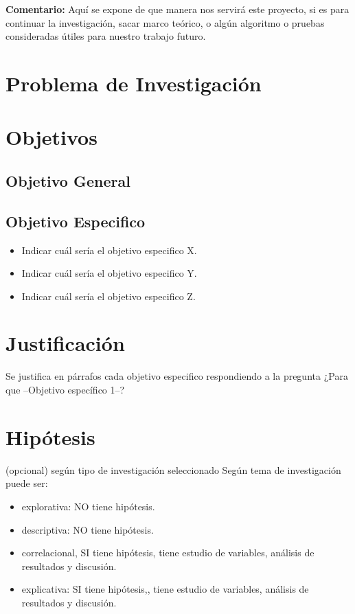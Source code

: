 \documentclass[a4paper,12pt]{report}
\begin{document}
\noindent
\textbf{Comentario:} Aquí se expone de que manera nos servirá este proyecto, si es para continuar la investigación, sacar marco teórico, o algún algoritmo o pruebas consideradas útiles para nuestro trabajo futuro.

\section{Problema de Investigación}
\section{Objetivos}
\subsection{Objetivo General}
\subsection{Objetivo Especifico}
\begin{itemize}
	\item Indicar cuál sería el objetivo especifico X.
	\item Indicar cuál sería el objetivo especifico Y.
	\item Indicar cuál sería el objetivo especifico Z.
\end{itemize}

\section{Justificación}
Se justifica en párrafos cada objetivo especifico respondiendo a la pregunta ¿Para que --Objetivo específico 1--?

\section{Hipótesis}
(opcional) según tipo de investigación seleccionado
Según tema de investigación puede ser:
\begin{itemize}
\item explorativa: NO tiene hipótesis.
\item descriptiva: NO tiene hipótesis.
\item correlacional, SI tiene hipótesis, tiene estudio de variables, análisis de resultados y discusión.
\item explicativa: SI tiene hipótesis,, tiene estudio de variables, análisis de resultados y discusión.
\end{itemize}
\end{document}
